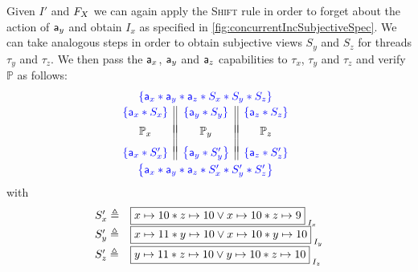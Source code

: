 Given $I'$ and $F_{X}$ we can again apply the \textsc{Shift} rule in order to forget about the action of $\mathsf{a}_y$ and obtain $I_x$ as specified in \fig\ref{fig:concurrentIncSubjectiveSpec}. We can take analogous steps in order to obtain subjective views $S_y$ and $S_z$ for threads $\tau_y$ and $\tau_z$. We then pass the $\mathsf{a}_x$, $\mathsf{a}_y$ and $\mathsf{a}_z$ capabilities to $\tau_x$, $\tau_y$ and $\tau_z$ and verify $\mathbb{P}$ as follows:
%
\[
\hspace*{-0.2cm}
\begin{array}{c}
	\color{blue}{\left\{\token a_x * \token a_y *  \token a_z *  S_x * S_y * S_z \right\}}\vspace*{2pt}\\
	
	\begin{array}{c || c || c}
		\color{blue}{\left\{\token a_x * S_x \right\}} & \color{blue}{\left\{\token a_y * S_y \right\}} & \color{blue}{\left\{\token a_z * S_z \right\}}\\
		&&\vspace*{-7pt}\\
		\mathbb{P}_x & \mathbb{P}_y & \mathbb{P}_z\\
		&&\vspace*{-5pt}\\

		\color{blue}{
			\left\{
					\token a_x * S'_x
			\right\}
		} 
		& 
		\color{blue}{
			\left\{
				\token a_y * S'_y
			\right\}
		} 

		&
		
		\color{blue}{
			\left\{
				\token a_z * S'_z
			\right\}
		} 		
		\vspace*{3pt}
	\end{array}\\
	\color{blue}{\left\{\token a_x * \token a_y *  \token a_z *  S'_x * S'_y * S'_z \right\}}\\
\end{array}
\]
%
with
%
\[
\begin{array}{l l}
	S'_x \eqdef & \shared{\cell{x}{10} * \cell{z}{10} \lor \cell{x}{10} * \cell{z}{9} }{I_x}\\
	S'_y \eqdef & \shared{\cell{x}{11} * \cell{y}{10} \lor \cell{x}{10} * \cell{y}{10} }{I_y}\\
	S'_z \eqdef & \shared{\cell{y}{11} * \cell{z}{10} \lor \cell{y}{10} * \cell{z}{10} }{I_z}
\end{array}
\]
%
%
